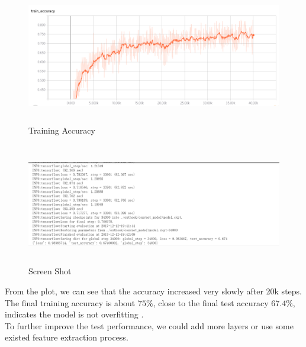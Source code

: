 \documentclass[hyperref]{article}
\theoremstyle{nonumberplain}
\begin{document}
\begin{figure}[htbp]
\centering
\includegraphics[width=440pt,height=170pt]{trainaccuracy.png}
\caption{Training Accuracy}
\label{accuracy}
\end{figure}

\begin{figure}[htbp]
\centering
\includegraphics[width=440pt,height=150pt]{bestaccuracy.png}
\caption{Screen Shot}
\label{best}
\end{figure}
From the plot, we can see that the accuracy increased very slowly after 20k steps. The final training accuracy is about $75\%$, close to the final test accuracy $67.4\%$, indicates the model is not overfitting . \\
To further improve the test performance, we could add more layers or use some existed feature extraction process.
\end{document}
